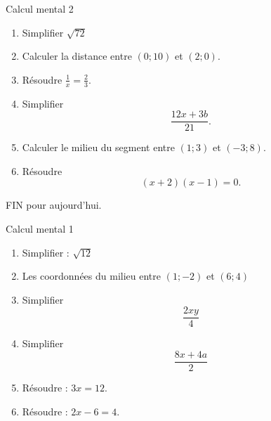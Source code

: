 \documentclass{beamer}
\begin{document}
\begin{frame}{Calcul mental 2}
    \pause
    \begin{enumerate}
        \item
            Simplifier \( \sqrt{72}\)
            \pause
        \item
            Calculer la distance entre \( (0;10)\) et \( (2;0)\).
            \pause
        \item
            Résoudre \( \frac{1}{ x }=\frac{ 2 }{ 3 }\).
            \pause
        \item
            Simplifier 
            \begin{equation*}
                \frac{ 12x+3b }{ 21 }.
            \end{equation*}
            \pause
        \item
            Calculer le milieu du segment entre \( (1;3)\) et \( (-3;8)\).
            \pause
        \item
            Résoudre
            \begin{equation*}
                (x+2)(x-1)=0.
            \end{equation*}
            \pause
    \end{enumerate}
    \begin{center}
        FIN pour aujourd'hui.
    \end{center}
\end{frame}

\begin{frame}{Calcul mental 1}

    \pause
    \begin{enumerate}
        \item
            Simplifier : \( \sqrt{12}\)


            \pause
        \item
            Les coordonnées du milieu entre \( (1;-2)\) et \( (6;4)\)
            \pause
        \item
            Simplifier 
            \begin{equation*}
                \frac{ 2xy }{ 4 }
            \end{equation*}
            \pause
        \item
            Simplifier
            \begin{equation*}
                \frac{ 8x+4a }{ 2 }
            \end{equation*}
            \pause
        \item
            Résoudre : \( 3x=12\).
            \pause
        \item
            Résoudre : \( 2x-6=4\).
    \end{enumerate}

\end{frame}
\end{document}
